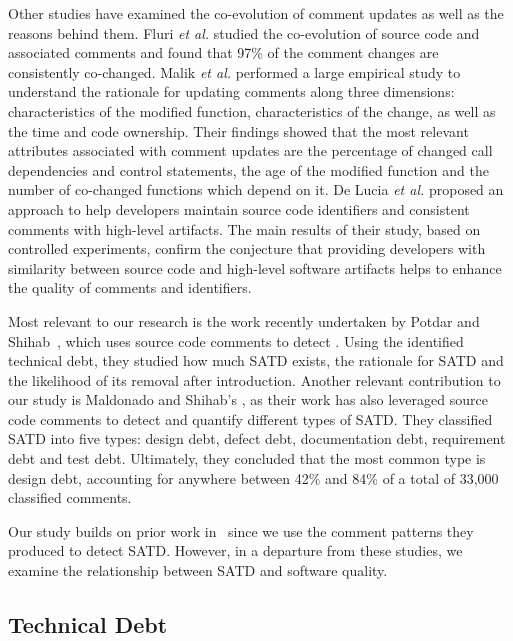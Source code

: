 Other studies have examined the co-evolution of comment updates as well as the reasons behind them. Fluri {\em et al.} \cite{fluri2007code} studied the co-evolution of source code and associated comments and found that 97\% of the comment changes are consistently co-changed. Malik {\em et al.}  \cite{malik2008understanding} performed a large empirical study to understand the rationale for updating comments along three dimensions: characteristics of the modified function, characteristics of the change, as well as the time and code ownership. Their findings showed that the most relevant attributes associated with comment updates are the percentage of changed call dependencies and control statements, the age of the modified function and the number of co-changed functions which depend on it. De Lucia {\em et al.} \cite{DeLucia2011} proposed an approach to help developers maintain source code identifiers and consistent comments with high-level artifacts. The main results of their study, based on controlled experiments, confirm the conjecture that providing  developers with similarity between source code and high-level software artifacts helps to enhance the quality of comments and identifiers.

Most relevant to our research is the work recently undertaken by Potdar and Shihab~\cite{ICSM_PotdarS14}, which uses source code comments to detect \SATD. Using the identified technical debt, they studied  how much SATD exists, the rationale for SATD and the likelihood of its removal after introduction. Another relevant contribution to our study is Maldonado and Shihab's \cite{MTD15p9}, as their work has also leveraged source code comments to detect and quantify different types of SATD. They classified SATD into five types:  design debt, defect debt, documentation debt, requirement debt and test debt. Ultimately, they concluded that  the  most common type is design debt, accounting for anywhere between 42\% and 84\% of a total of 33,000 classified comments.

Our study builds on prior work in~\cite{ICSM_PotdarS14,MTD15p9} since we use the comment patterns they produced to detect SATD. However, in a departure from these studies, we examine the relationship between SATD and software quality.


\subsection{Technical Debt}

